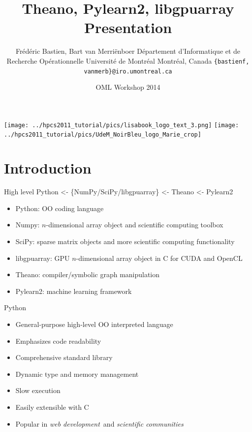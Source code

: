 \documentclass[utf8x,xcolor=pdftex,dvipsnames,table]{beamer}
\title{Theano, Pylearn2, libgpuarray Presentation}
\author{%
\footnotesize
Frédéric Bastien, Bart van Merriënboer \newline
Département d'Informatique et de Recherche Opérationnelle \newline
Université de Montréal \newline
Montréal, Canada \newline
\texttt{\{bastienf, vanmerb\}@iro.umontreal.ca} \newline \newline
}
\date{OML Workshop 2014}
\begin{document}
\begin{frame}[plain]
 \titlepage
 \vspace{-5em}
 \texttt{[image: ../hpcs2011\_tutorial/pics/lisabook\_logo\_text\_3.png]}
 \hfill
 \texttt{[image: ../hpcs2011\_tutorial/pics/UdeM\_NoirBleu\_logo\_Marie\_crop]}
\end{frame}

\section{Introduction}
\begin{frame}{High level}\setcounter{page}{1}
  Python <- \{NumPy/SciPy/libgpuarray\} <- Theano <- Pylearn2
  \begin{itemize}
  \item Python: OO coding language
  \item Numpy: $n$-dimensional array object and scientific computing toolbox
  \item SciPy: sparse matrix objects and more scientific computing functionality
  \item libgpuarray: GPU $n$-dimensional array object in C for CUDA and OpenCL
  \item Theano: compiler/symbolic graph manipulation
  \item Pylearn2: machine learning framework
  \end{itemize}
\end{frame}



\begin{frame}{Python}
  \begin{itemize}
  \item General-purpose high-level OO interpreted language
  \item Emphasizes code readability
  \item Comprehensive standard library
  \item Dynamic type and memory management
  \item Slow execution
  \item Easily extensible with C
  \item Popular in {\em web development}\ and {\em scientific communities}
  \end{itemize}
\end{frame}
\end{document}

